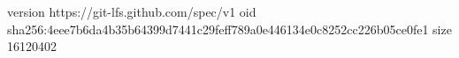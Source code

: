 version https://git-lfs.github.com/spec/v1
oid sha256:4eee7b6da4b35b64399d7441c29feff789a0e446134e0c8252cc226b05ce0fe1
size 16120402
